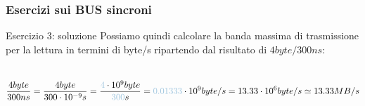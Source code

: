 \begin{frame}
	\frametitle{Esercizi sui BUS sincroni}
	
	\begin{block}{Esercizio 3: soluzione}
		Possiamo quindi calcolare la banda massima di trasmissione per la lettura in termini di byte/s ripartendo dal risultato di $4byte/300ns$:\\~\\
		
		\begin{scriptsize}
		$$\frac{4byte}{300ns} = \frac{4byte}{300 \cdot 10^{-9} s} = \frac{{\color{CpuBlue}4} \cdot 10^{9}byte}{{\color{CpuBlue}300}s}= {\color{CpuBlue}0.01333} \cdot 10^{9} byte/s = 13.33 \cdot 10^{6} byte/s \simeq 13.33 MB/s$$
		\end{scriptsize}
		
	\end{block}
\end{frame}


%
%	


